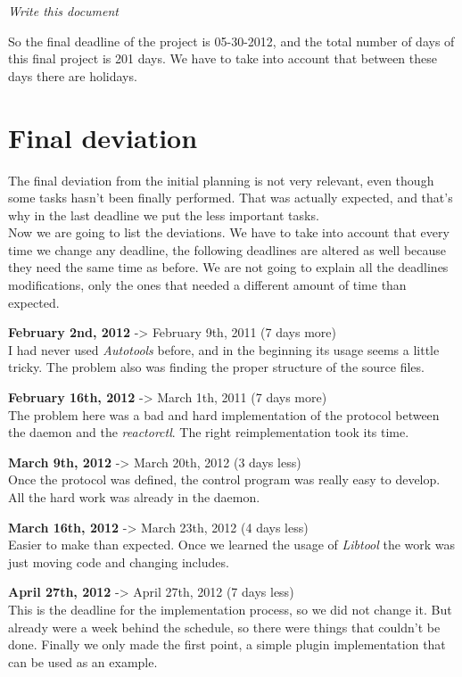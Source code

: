 \begin{list}{-}{{\bf May 30th, 2012 ( 33 days)}}
  \item \emph{Write this document}
\end{list}
So the final deadline of the project is 05-30-2012, and the total number of days of this final project is 201 days. We have to take into
account that between these days there are holidays.
\section{Final deviation}
The final deviation from the initial planning is not very relevant, even though some tasks hasn't been finally performed. That was
actually expected, and that's why in the last deadline we put the less important tasks.\\
Now we are going to list the deviations. We have to take into account that every time we change any deadline, the following deadlines are
altered as well because they need the same time as before. We are not going to explain all the deadlines modifications, only the ones
that needed a different amount of time than expected.\\
\begin{list}{-}{The deviations are explained as follows:}
  \item {\bf February 2nd, 2012} -> February 9th, 2011 (7 days more)\\
    I had never used \emph{Autotools} before, and in the beginning its usage seems a little tricky. The problem also was finding the proper
    structure of the source files.
  \item {\bf February 16th, 2012} -> March 1th, 2011 (7 days more)\\
    The problem here was a bad and hard implementation of the protocol between the daemon and the \emph{reactorctl}. The right
    reimplementation took its time.
  \item {\bf March 9th, 2012} -> March 20th, 2012 (3 days less)\\
    Once the protocol was defined, the control program was really easy to develop. All the hard work was already in the daemon.
  \item {\bf March 16th, 2012} -> March 23th, 2012 (4 days less)\\
    Easier to make than expected. Once we learned the usage of \emph{Libtool} the work was just moving code and changing includes.
  \item {\bf April 27th, 2012} -> April 27th, 2012 (7 days less)\\
    This is the deadline for the implementation process, so we did not change it. But already were a week behind the schedule, so there
    were things that couldn't be done. Finally we only made the first point, a simple plugin implementation that can be used as an example.
\end{list}

